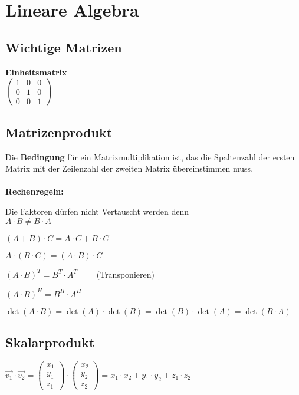 \section{Lineare Algebra}

\subsection{Wichtige Matrizen}
\textbf{Einheitsmatrix}\\
$
\left(\begin{array}{ccc}
	1 & 0 & 0\\
	0 & 1 & 0\\
	0 & 0 & 1
\end{array}\right)
$

\subsection{Matrizenprodukt}
Die \textbf{Bedingung} für ein Matrixmultiplikation ist, das die Spaltenzahl der ersten Matrix mit der Zeilenzahl der zweiten Matrix übereinstimmen muss.\\[10pt]
\\[10pt]
%
\textbf{Rechenregeln:}
\begin{compactitem}
	\item Die Faktoren dürfen nicht Vertauscht werden denn \\
	$A\cdot B \ne B\cdot A$
	\item $(A + B) \cdot C = A \cdot C + B \cdot C$
	\item $A \cdot(B \cdot C)=(A \cdot B) \cdot C$
	\item $(A \cdot B)^{T}=B^{T} \cdot A^{T} \qquad$ (Transponieren)
	\item $(A \cdot B)^{H}=B^{H} \cdot A^{H}$
	\item $\operatorname{det}(A \cdot B)=\operatorname{det}(A) \cdot \operatorname{det}(B)=\operatorname{det}(B) \cdot \operatorname{det}(A)=\operatorname{det}(B \cdot A)$
\end{compactitem}

\subsection{Skalarprodukt}
$\overrightarrow{v_{1}} \cdot \overrightarrow{v_{2}}=\left(\begin{array}{l}
x_{1} \\
y_{1} \\
z_{1}
\end{array}\right) \cdot\left(\begin{array}{l}
x_{2} \\
y_{2} \\
z_{2}
\end{array}\right)=x_{1} \cdot x_{2}+y_{1} \cdot y_{2}+z_{1} \cdot z_{2}$\\[10pt]

